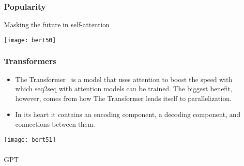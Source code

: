 \begin{frame}[fragile]\frametitle{Popularity}

Masking the future in self-attention

\begin{center}
\texttt{[image: bert50]}
\end{center}	

 
\end{frame}


\begin{frame}[fragile]\frametitle{Transformers}


\begin{itemize}
\item The Transformer  is a model that uses attention to boost the speed with which seq2seq with attention models can be trained. The biggest benefit, however, comes from how The Transformer lends itself to parallelization. 
\item In its heart it contains an encoding component, a decoding component, and connections between them.
\end{itemize}	 

\begin{center}
\texttt{[image: bert51]}
\end{center}	

\end{frame}

\begin{frame}[fragile]\frametitle{}
\begin{center}
{\Large GPT}
\end{center}
\end{frame}


